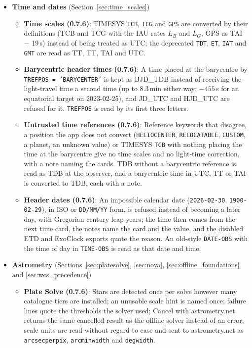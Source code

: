 \documentclass[11pt,a4paper]{article}
\newcommand{\code}[1]{\texttt{\small #1}}
\begin{document}
    \begin{itemize}[nosep]
    \item \textbf{Time and dates} (Section~\ref{sec:time_scales})
        \begin{itemize}[nosep]
        \item \textbf{Time scales (0.7.6)}: TIMESYS \code{TCB}, \code{TCG} and \code{GPS} are converted by their definitions (TCB and TCG with the IAU rates $L_B$ and $L_G$, GPS as TAI $-$ 19\,s) instead of being treated as UTC; the deprecated \code{TDT}, \code{ET}, \code{IAT} and \code{GMT} are read as TT, TT, TAI and UTC.
        \item \textbf{Barycentric header times (0.7.6)}: A time placed at the barycentre by \code{TREFPOS = 'BARYCENTER'} is kept as BJD\_TDB instead of receiving the light-travel time a second time (up to 8.3\,min either way; $-455$\,s for an equatorial target on 2023-02-25), and JD\_UTC and HJD\_UTC are refused for it. \code{TREFPOS} is read by its first three letters.
        \item \textbf{Untrusted time references (0.7.6)}: Reference keywords that disagree, a position the app does not convert (\code{HELIOCENTER}, \code{RELOCATABLE}, \code{CUSTOM}, a planet, an unknown value) or TIMESYS \code{TCB} with nothing placing the time at the barycentre give no time scales and no light-time correction, with a note naming the cards. TDB without a barycentric reference is read as TDB at the observer, and a barycentric time in UTC, TT or TAI is converted to TDB, each with a note.
        \item \textbf{Header dates (0.7.6)}: An impossible calendar date (\code{2026-02-30}, \code{1900-02-29}), in ISO or \code{DD/MM/YY} form, is refused instead of becoming a later day, with Gregorian century leap years; the time then comes from the next time card, the notes name the card and the value, and the disabled ETD and ExoClock exports quote the reason. An old-style \code{DATE-OBS} with the time of day in \code{TIME-OBS} is read as that date and time.
        \end{itemize}
    \item \textbf{Astrometry} (Sections~\ref{sec:platesolve}, \ref{sec:nova}, \ref{sec:offline_foundations} and \ref{sec:wcs_precedence})
        \begin{itemize}[nosep]
        \item \textbf{Plate Solve (0.7.6)}: Stars are detected once per solve however many catalogue tiers are installed; an unusable scale hint is named once; failure lines quote the thresholds the solver used; Cancel with astrometry.net returns the same cancelled result as the offline solver instead of an error; scale units are read without regard to case and sent to astrometry.net as \code{arcsecperpix}, \code{arcminwidth} and \code{degwidth}.

\end{itemize}
\end{itemize}
\end{document}
